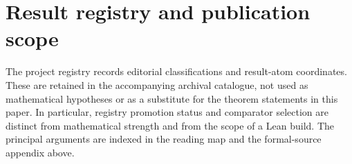 \section{Result registry and publication scope}
\label{sec:erdos-1049-complete-family-map}
The project registry records editorial classifications and result-atom
coordinates. These are retained in the accompanying archival catalogue,
not used as mathematical hypotheses or as a substitute for the theorem
statements in this paper. In particular, registry promotion status and
comparator selection are distinct from mathematical strength and from
the scope of a Lean build. The principal arguments are indexed in the
reading map and the formal-source appendix above.

